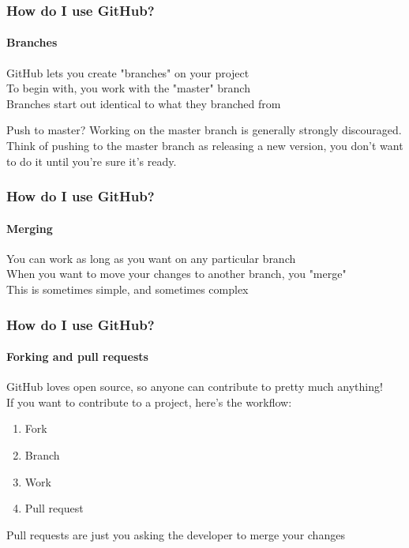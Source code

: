 \documentclass{beamer}
\begin{document}
\begin{frame}
  \frametitle{How do I use GitHub?}
  \framesubtitle{Branches}
  GitHub lets you create "branches" on your project\\\pause\vspace{0.25em}
  To begin with, you work with the "master" branch\\\pause\vspace{0.25em}
  Branches start out identical to what they branched from\\\pause\vspace{0.25em}

  \begin{alertblock}{Push to master?}
    Working on the master branch is generally strongly discouraged. Think of pushing to the master branch as releasing a new version, you don't want to do it until you're sure it's ready.
  \end{alertblock}
\end{frame}

\begin{frame}
  \frametitle{How do I use GitHub?}
  \framesubtitle{Merging}
  You can work as long as you want on any particular branch\\\pause\vspace{0.25em}
  When you want to move your changes to another branch, you "merge"\\\pause\vspace{0.25em}
  This is sometimes simple, and sometimes complex\\\vspace{0.25em}
\end{frame}

\begin{frame}
  \frametitle{How do I use GitHub?}
  \framesubtitle{Forking and pull requests}
  GitHub loves open source, so anyone can contribute to pretty much anything!\\\pause\vspace{0.25em}
  If you want to contribute to a project, here's the workflow:
  \begin{enumerate}[<+->]
    \item Fork
    \item Branch
    \item Work
    \item Pull request
  \end{enumerate}\pause
  Pull requests are just you asking the developer to merge your changes
\end{frame}
\end{document}
